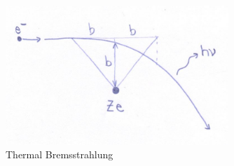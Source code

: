 \documentclass{article}
\begin{document}
\begin{figure}
    \centering
    \includegraphics[width=0.75\textwidth]{800px-Bremsstrahlung.jpg}
    \caption{Thermal Bremsstrahlung}
    \label{fig:thermBremsstrahlung}
\end{figure}
\end{document}
